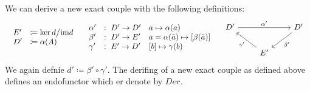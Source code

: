 \begin{corollary}
	We can derive a new exact couple with the following definitions:
	\begin{equation*}
		\begin{array}{llc}
			\begin{array}{ll}
				E'&\coloneq \ker d \big/ \im d \\
				D'&\coloneq \alpha(A)
			\end{array}&
			\begin{array}{lll}
				\alpha'&:~ D'\to D'&a\mapsto \alpha(a)\\
				\beta' &:~ D'\to E'&a=\alpha(\tilde{a})\mapsto [\beta(\tilde{a})]\\
				\gamma' &:~ E'\to D' &[b]\mapsto\gamma(b) \\
			\end{array}
			&
			\begin{tikzcd}
				D'\arrow[rr,"\alpha'"]&&D'\arrow[dl,"\beta'"]\\
				&E' \arrow[ul,"\gamma'"]&
			\end{tikzcd}
		\end{array}
	\end{equation*} We again defnie $d'\coloneq \beta'\circ \gamma'$.
	The derifing of a new exact couple as defined above defines an endofunctor which er denote by $Der$.
\end{corollary}
